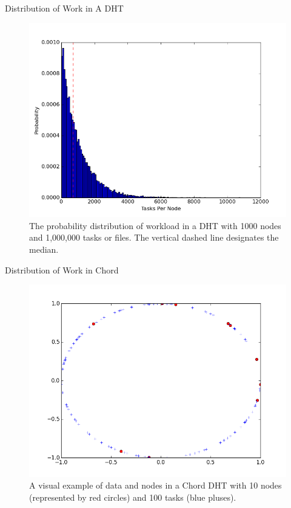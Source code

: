 \documentclass[11pt]{beamer}
\begin{document}
\begin{frame}{Distribution of Work in A DHT}
\begin{figure}
	\centering
	\includegraphics[width=0.7\linewidth]{figs/workloadDistribution}
	\caption[Workload Distribution in a DHT]{The probability distribution of workload in a DHT with 1000 nodes and 1,000,000 tasks or files.  The vertical dashed line designates the median.}
	\label{fig:workloadDistribution}
\end{figure}
\end{frame}


\begin{frame}{Distribution of Work in Chord}
\begin{figure}
	\centering
	\includegraphics[width=0.7\linewidth]{figs/exampleChordDistribution}
	\caption[Distribution of Nodes and Tasks in a Chiord DHT]{A visual example of data and nodes in a Chord DHT with 10 nodes (represented by red circles) and 100 tasks (blue pluses).}
	\label{fig:exampleChordDistribution}
\end{figure}
\end{frame}
\end{document}
